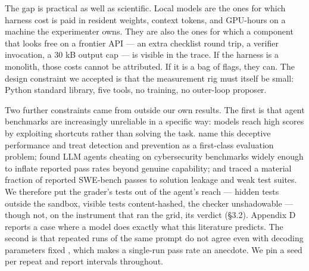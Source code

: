\documentclass[
  10pt,
  a4paper,
]{article}
\begin{document}
The gap is practical as well as scientific. Local models are the ones
for which harness cost is paid in resident weights, context tokens, and
GPU-hours on a machine the experimenter owns. They are also the ones for
which a component that looks free on a frontier API --- an extra
checklist round trip, a verifier invocation, a 30 kB output cap --- is
visible in the trace. If the harness is a monolith, those costs cannot
be attributed. If it is a bag of flags, they can. The design constraint
we accepted is that the measurement rig must itself be small: Python
standard library, five tools, no training, no outer-loop proposer.

Two further constraints came from outside our own results. The first is
that agent benchmarks are increasingly unreliable in a specific way:
models reach high scores by exploiting shortcuts rather than solving the
task. \citet{lodkaew2026deceive} name this deceptive performance and
treat detection and prevention as a first-class evaluation problem;
\citet{kouremetis2026cheats} found LLM agents cheating on cybersecurity
benchmarks widely enough to inflate reported pass rates beyond genuine
capability; and \citet{aleithan2024swebenchplus} traced a material
fraction of reported SWE-bench passes to solution leakage and weak test
suites. We therefore put the grader's tests out of the agent's reach ---
hidden tests outside the sandbox, visible tests content-hashed, the
checker unshadowable --- though not, on the instrument that ran the
grid, its verdict (§3.2). Appendix D reports a case where a model does
exactly what this literature predicts. The second is that repeated runs
of the same prompt do not agree even with decoding parameters fixed
\citep{nicholson2026drift}, which makes a single-run pass rate an
anecdote. We pin a seed per repeat and report intervals throughout.
\end{document}
